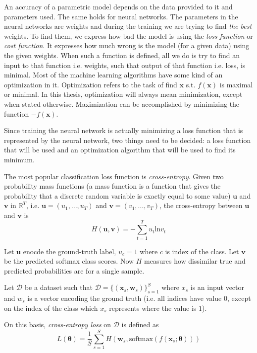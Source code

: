 An accuracy of a parametric model depends on the data provided to it and  parameters used. The same holds for neural networks. The parameters in the neural networks are weights and during the training we are trying to find \textit{the best} weights. To find them, we express how bad the model is using the \textit{loss function} or \textit{cost function}. It expresses how much wrong is the model (for a given data) using the given weights. When such a function is defined, all we do is try to find an input to that function i.e. weights, such that output of that function i.e. loss, is minimal. Most of the machine learning algorithms have some kind of an optimization in it. Optimization refers to the task of find $\pmb x$ s.t. $f(\pmb x)$ is maximal or minimal. In this thesis, optimization will always mean minimization, except when stated otherwise. Maximization can be accomplished by minimizing the function $-f(\pmb x)$.

Since training the neural network is actually minimizing a loss function that is represented by the neural network, two things need to be decided: a loss function that will be used and an optimization algorithm that will be used to find its minimum.

The most popular classification loss function is \textit{cross-entropy}. Given two probability mass functions (a mass function is a function that gives the probability that a discrete random variable is exactly equal to some value) $\pmb u$ and $\pmb v$ in $\mathbb{R}^T$, i.e. $\pmb u = (u_1, ..., u_T)$ and $\pmb v =  (v_1, ..., v_T)$, the cross-entropy between $\pmb u$ and $\pmb v$ is
 \begin{equation}
H (\pmb u, \pmb v)= - \sum_{t=1}^T  u_t  \text{ln} v_t 
\end{equation}

Let $\pmb u$ enocde the ground-truth label, $u_c = 1$ where $c$ is index of the class. Let $\pmb v$ be the predicted softmax class scores. Now $H$ measures how dissimilar true and predicted probabilities are for a single sample.

Let $\mathcal{D}$ be a dataset such that
$ \mathcal{D} = \{ (\pmb x_s, \pmb w_s)\}_{s=1}^{S}$ where $x_s$ is an input vector and $w_s$ is a vector encoding the ground truth (i.e. all indices have value $0$, except on the index of the class which $x_s$ represents where the value is $1$).

On this basis, \textit{cross-entropy loss} on $\mathcal{D}$ is defined as
\begin{equation} \label{eq:loss-function}
L(\pmb \theta) = \frac{1}{S} \sum_{s=1}^{S} H (\pmb w_s, \text{softmax} (f(\pmb x_s ; \pmb \theta)))
\end{equation}

